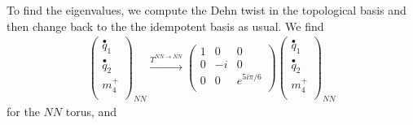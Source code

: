 To find the eigenvalues, we compute the Dehn twist in the topological basis and then change back to the 
the idempotent basis as usual. 
We find
\begin{align}
\left( \begin{matrix}
\stackrel{\bullet}{q}_{1}\\
\stackrel{\bullet}{q}_{2}\\
m_4^+ \\ 
\end{matrix} \right)_{NN} \xrightarrow{T^{NN\rightarrow NN}}
\left( \begin{matrix} 
1 & 0&0 \\
0 & -i & 0 \\
0 & 0& e^{5 i \pi /6}\\
\end{matrix} \right) 
\left( \begin{matrix}
\stackrel{\bullet}{q}_{1}\\
\stackrel{\bullet}{q}_{2}\\
m_4^+ \\ 
\end{matrix} \right)_{NN}
\end{align}
for the $NN$ torus, and 
